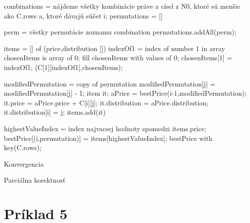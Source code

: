 \documentclass[paper=a4, fontsize=11pt]{scrartcl} %
\numberwithin{equation}{section} %
\numberwithin{figure}{section} %
\numberwithin{table}{section} %
\begin{document}
\begin{algorithmic}[1]
        \State combinations = nájdeme všetky kombinácie práve a císel z N0, ktoré sú menšie ako C.rows a, ktoré dávajú súčet i;
        \State permutations = []
        
	    \State perm = všetky permutácie zoznamu combination
	    \State permutations.addAll(perm);
        \EndFor
		
            \State items = [] of (price,distribution [])
                \State indexOf1 = index of number 1 in array
                \State chosenItems is array of 0;
                \State fill chosenItems with values of 0;
                \State chosenItems[1] = indexOf1;
                \State \Return (C[1][indexOf1],chosenItems);
            \EndIf
            
                \State modifiedPermutation = copy of permutation
		    \State modifiedPermutation[j] = modifiedPermutation[j] - 1;
		    \State	item it;
		    \State aPrice = bestPrice(i-1,modifiedPermutation);
		    \State it.price = aPrice.price + C[i][j];
		    \State it.distribution = aPrice.distribution;
		    \State it.distribution[i] = j;
                    \State items.add(it)
                 \EndIf
            \EndFor			
		
            \State highestValueIndex = index najvacsej hodnoty spomedzi items.price;
            \State bestPrice[(i,permutation)] = items[highestValueIndex];		
        \EndFor
    \EndFor
    \State \Return bestPrice with key(C.rows);
\EndFunction
\end{algorithmic}

Konvergencia



Parciálna korektnosť



\pagebreak


\section*{Príklad 5}
\end{document}
